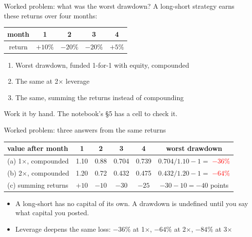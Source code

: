 \documentclass[aspectratio=169,10pt]{beamer}
\begin{document}
\begin{frame}{Worked problem: what was the worst drawdown?}
A long-short strategy earns these returns over four months:
\vskip 6pt
\begin{center}
\renewcommand{\arraystretch}{1.4}
\begin{tabular}{ccccc}
\toprule
month & 1 & 2 & 3 & 4 \\
\midrule
return & $+10\%$ & $-20\%$ & $-20\%$ & $+5\%$ \\
\bottomrule
\end{tabular}
\end{center}
\vskip 10pt
\begin{enumerate}
\item[(a)] Worst drawdown, funded 1-for-1 with equity, compounded
\vskip 6pt
\item[(b)] The same at 2$\times$ leverage
\vskip 6pt
\item[(c)] The same, summing the returns instead of compounding
\end{enumerate}
\vskip 10pt
{\small Work it by hand. The notebook's §5 has a cell to check it.}
\end{frame}

\begin{frame}{Worked problem: three answers from the same returns}
\begin{center}
\renewcommand{\arraystretch}{1.4}
\begin{tabular}{lccccc}
\toprule
value after month & 1 & 2 & 3 & 4 & worst drawdown \\
\midrule
(a) 1$\times$, compounded & 1.10 & 0.88 & 0.704 & 0.739 & $0.704 / 1.10 - 1 = $ \textcolor{red}{$-36\%$} \\
(b) 2$\times$, compounded & 1.20 & 0.72 & 0.432 & 0.475 & $0.432 / 1.20 - 1 = $ \textcolor{red}{$-64\%$} \\
(c) summing returns & $+10$ & $-10$ & $-30$ & $-25$ & $-30 - 10 = -40$ points \\
\bottomrule
\end{tabular}
\end{center}
\vskip 12pt
\begin{itemize}
\item A long-short has no capital of its own. A drawdown is undefined until you say what capital you posted.
\vskip 6pt
\item Leverage deepens the same loss: $-36\%$ at 1$\times$, $-64\%$ at 2$\times$, $-84\%$ at 3$\times$
\end{itemize}
\end{frame}
\end{document}
